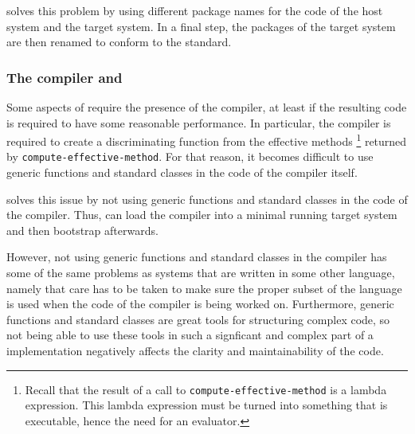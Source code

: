 \sbcl{} solves this problem by using different package names for the
code of the host system and the target system.  In a final step, the
packages of the target system are then renamed to conform to the
standard.

\subsubsection{The compiler and \clos{}}

Some aspects of \clos{} require the presence of the compiler, at least
if the resulting code is required to have some reasonable
performance.  In particular, the compiler is required to create a
discriminating function from the effective methods%
\footnote{Recall that the result of a call to
  \texttt{compute-effective-method} is a lambda expression.  This
  lambda expression must be turned into something that is executable,
  hence the need for an evaluator.}
returned by \texttt{compute-effective-method}.
For that reason, it becomes difficult to use generic
functions and standard classes in the code of the compiler itself.

\sbcl{} solves this issue by not using generic functions and standard
classes in the code of the compiler.  Thus, \sbcl{} can load the
compiler into a minimal running target system and then bootstrap
\clos{} afterwards.

However, not using generic functions and standard classes in the
compiler has some of the same problems as \commonlisp{} systems that
are written in some other language, namely that care has to be taken
to make sure the proper subset of the language is used when the code
of the compiler is being worked on.  Furthermore, generic functions
and standard classes are great tools for structuring complex code, so
not being able to use these tools in such a signficant and complex
part of a \commonlisp{} implementation negatively affects the clarity
and maintainability of the code.
